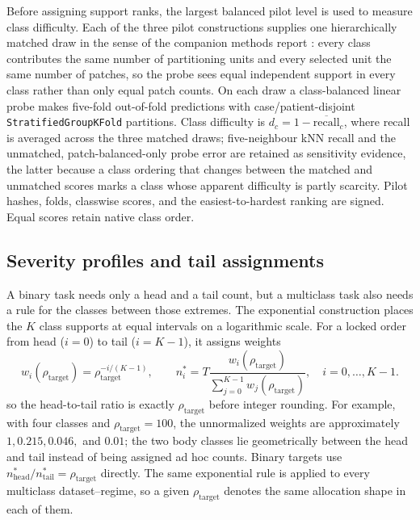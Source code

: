 \documentclass[11pt]{article}
\begin{document}
Before assigning support ranks, the largest balanced pilot level is used to measure class difficulty. Each of the three pilot constructions supplies one hierarchically matched draw in the sense of the companion methods report \citep{queisler2026imbalanceMethods}: every class contributes the same number of partitioning units and every selected unit the same number of patches, so the probe sees equal independent support in every class rather than only equal patch counts. On each draw a class-balanced linear probe makes five-fold out-of-fold predictions with case/patient-disjoint \texttt{StratifiedGroupKFold} partitions. Class difficulty is $d_c=1-\overline{\mathrm{recall}}_c$, where recall is averaged across the three matched draws; five-neighbour kNN recall and the unmatched, patch-balanced-only probe error are retained as sensitivity evidence, the latter because a class ordering that changes between the matched and unmatched scores marks a class whose apparent difficulty is partly scarcity. Pilot hashes, folds, classwise scores, and the easiest-to-hardest ranking are signed. Equal scores retain native class order.

\subsection{Severity profiles and tail assignments}
A binary task needs only a head and a tail count, but a multiclass task also needs a rule for the classes between those extremes. The exponential construction places the $K$ class supports at equal intervals on a logarithmic scale. For a locked order from head ($i=0$) to tail ($i=K-1$), it assigns weights
\begin{equation}
  w_i(\rho_{\mathrm{target}})=\rho_{\mathrm{target}}^{-i/(K-1)},\qquad
  n_i^*=T\frac{w_i(\rho_{\mathrm{target}})}{\sum_{j=0}^{K-1}w_j(\rho_{\mathrm{target}})},
  \quad i=0,\ldots,K-1.
  \label{eq:construction}
\end{equation}
\noindent so the head-to-tail ratio is exactly $\rho_{\mathrm{target}}$ before integer rounding. For example, with four classes and $\rho_{\mathrm{target}}=100$, the unnormalized weights are approximately $1,0.215,0.046,$ and $0.01$; the two body classes lie geometrically between the head and tail instead of being assigned ad hoc counts. Binary targets use $n_{\mathrm{head}}^*/n_{\mathrm{tail}}^*=\rho_{\mathrm{target}}$ directly. The same exponential rule is applied to every multiclass dataset--regime, so a given $\rho_{\mathrm{target}}$ denotes the same allocation shape in each of them.
\end{document}
